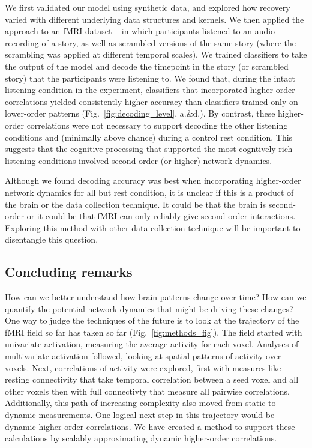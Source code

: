 \documentclass[english]{article}
\begin{document}
We first validated our model using synthetic data, and explored how
recovery varied with different underlying data structures and kernels.   We then 
applied the approach to an fMRI dataset
~\citep{SimoEtal16} in which participants listened to an audio
recording of a story, as well as scrambled versions of the same story
(where the scrambling was applied at different temporal scales).  We
trained classifiers to take the output of the model and decode the
timepoint in the story (or scrambled story) that the participants were
listening to. We found that, during the intact listening condition in the
experiment, classifiers that incorporated higher-order correlations
yielded consistently higher accuracy than classifiers trained only on
lower-order patterns (Fig.~\ref{fig:decoding_level},  a.\&d.).  By contrast, these
higher-order correlations were not necessary to support decoding the other
listening conditions and (minimally
above chance) during a control rest condition.  This suggests
that the cognitive processing that supported the most cogntively rich listening conditions
involved second-order (or higher) network dynamics.

Although we found decoding accuracy was best when incorporating
higher-order network dynamics for all but rest
  condition, it is unclear if this is a product of the brain or the
  data collection technique.  It could be that the brain is
  second-order or it could be that fMRI can
  only reliably give second-order interactions. Exploring this method
  with other data collection technique will be important to
  disentangle this question.



  \subsection*{Concluding remarks}

How can we better understand how brain patterns change over
time? How can we quantify the potential network dynamics that might be
driving these changes? One way to judge the techniques of the future is
to look at the trajectory of the fMRI field so far has taken so far
(Fig.~\ref{fig:methods_fig}).  The field started with 
univariate activation, measuring the average activity for each voxel.
Analyses of multivariate activation followed, looking at spatial patterns of
activity over voxels. Next, correlations of activity were explored, first
with measures like resting connectivity that take temporal correlation
between a seed voxel and all other voxels then with full connectivty
that measure all pairwise correlations.  Additionally, this path of increasing
complexity also moved from static to dynamic measurements.  One
logical next step in this trajectory would be dynamic higher-order
correlations. We have created a method 
to support these calculations by scalably approximating dynamic higher-order
correlations.  
\end{document}
